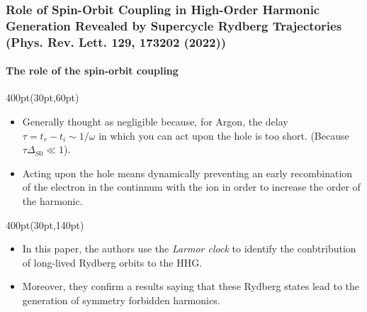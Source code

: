 \begin{frame}
\frametitle{
Role of Spin-Orbit Coupling in High-Order Harmonic Generation
Revealed by Supercycle Rydberg Trajectories
\footnotesize (Phys. Rev. Lett. 129, 173202 (2022))
}
	\framesubtitle{The role of the spin-orbit coupling}
\small
\footnotesize
\begin{textblock*}{400pt}(30pt,60pt)
\begin{itemize}
\item Generally thought as negligible because, for Argon, 
the delay $\tau=t_r - t_i \sim 1/\omega$ 
in which you can act upon the hole is too short.
(Because $\tau\Delta_{S0} \ll 1$).
\item Acting upon the hole means dynamically preventing 
an early recombination of the electron in the continnum with the ion
in order to increase the order of the harmonic.
\end{itemize}
\end{textblock*}


\begin{textblock*}{400pt}(30pt,140pt)
\begin{itemize}
\item In this paper, the authors use the \textit{Larmor clock} to identify 
the conbtribution of long-lived Rydberg orbits to the HHG.
\item Moreover, they confirm a results saying that these Rydberg states 
lead to the generation of symmetry forbidden harmonics.
\end{itemize}
\end{textblock*}




\end{frame}


